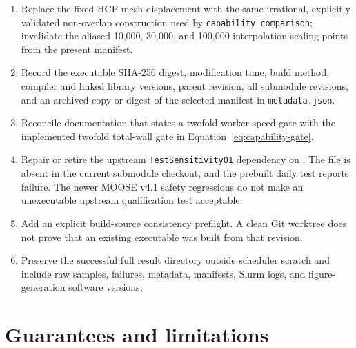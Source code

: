 \documentclass[11pt]{article}
\newcommand{\code}[1]{\texttt{#1}}
\begin{document}
\begin{enumerate}[leftmargin=*]
  \item Replace the fixed-HCP mesh displacement with the same irrational, explicitly validated
  non-overlap construction used by \code{capability\_comparison}; invalidate the aliased 10,000,
  30,000, and 100,000 interpolation-scaling points from the present manifest.
  \item Record the executable SHA-256 digest, modification time, build method, compiler and linked
  library versions, parent revision, all submodule revisions, and an archived copy or digest of
  the selected manifest in \code{metadata.json}.
  \item Reconcile documentation that states a twofold worker-speed gate with the implemented
  twofold total-wall gate in Equation~\eqref{eq:capability-gate}.
  \item Repair or retire the upstream \code{TestSensitivity01} dependency on
  .  The file is absent in the
  current submodule checkout, and the prebuilt daily test reports failure.  The newer MOOSE v4.1
  safety regressions do not make an unexecutable upstream qualification test acceptable.
  \item Add an explicit build-source consistency preflight.  A clean Git worktree does not prove
  that an existing executable was built from that revision.
  \item Preserve the successful full result directory outside scheduler scratch and include raw
  samples, failures, metadata, manifests, Slurm logs, and figure-generation software versions.
\end{enumerate}

\section{Guarantees and limitations}
\end{document}
